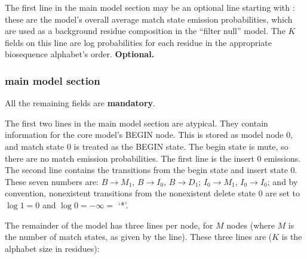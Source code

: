 \begin{wideitem}
\item [\emprog{COMPO <f>*K}] The first line in the main model section
may be an optional line starting with : these are the
model's overall average match state emission probabilities, which are
used as a background residue composition in the ``filter null''
model. The $K$ fields on this line are log probabilities for each
residue in the appropriate biosequence alphabet's
order. \textbf{Optional.}

\end{wideitem}

\subsubsection{main model section}

All the remaining fields are \textbf{mandatory}.

The first two lines in the main model section are atypical. They
contain information for the core model's BEGIN node. This is stored as
model node 0, and match state 0 is treated as the BEGIN state.  The
begin state is mute, so there are no match emission probabilities. The
first line is the insert 0 emissions. The second line contains the
transitions from the begin state and insert state 0.  These seven
numbers are: $B \rightarrow M_1$, $B \rightarrow I_0$, $B \rightarrow
D_1$; $I_0 \rightarrow M_1$, $I_0 \rightarrow I_0$; and by convention,
nonexistent transitions from the nonexistent delete state 0 are set to
$\log 1 = 0$ and $\log 0 = -\infty = $ `*'.

The remainder of the model has three lines per node, for $M$ nodes
(where $M$ is the number of match states, as given by the 
line). These three lines are ($K$ is the alphabet size in residues):

